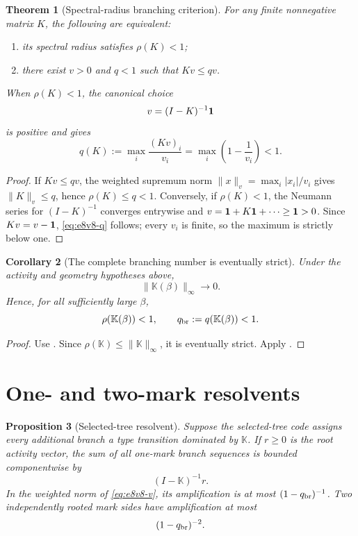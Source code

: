 \documentclass[11pt,oneside]{book}
\newtheorem{theorem}{Theorem}[chapter]
\newtheorem{proposition}[theorem]{Proposition}
\newtheorem{corollary}[theorem]{Corollary}
\theoremstyle{definition}
\theoremstyle{remark}
\begin{document}
\begin{theorem}[Spectral-radius branching criterion]
\label{thm:e8v8-spectral}
For any finite nonnegative matrix \(K\), the following are equivalent:
\begin{enumerate}[label=\textup{(\roman*)},leftmargin=3.5em]
\item its spectral radius satisfies \(\rho(K)<1\);
\item there exist \(v>0\) and \(q<1\) such that \(Kv\le qv\).
\end{enumerate}
When \(\rho(K)<1\), the canonical choice
\[
 v=(I-K)^{-1}{\bf1}                                 \label{eq:e8v8-v}
\]
is positive and gives
\[
 q(K):=\max_i\frac{(Kv)_i}{v_i}
 =\max_i\left(1-\frac1{v_i}\right)<1.               \label{eq:e8v8-q}
\]
\end{theorem}

\begin{proof}
If \(Kv\le qv\), the weighted supremum norm
\(\|x\|_v=\max_i|x_i|/v_i\) gives \(\|K\|_v\le q\), hence
\(\rho(K)\le q<1\).  Conversely, if \(\rho(K)<1\), the Neumann series
for \((I-K)^{-1}\) converges entrywise and
\(v={\bf1}+K{\bf1}+\cdots\ge{\bf1}>0\).
Since \(Kv=v-{\bf1}\), \eqref{eq:e8v8-q} follows; every \(v_i\) is
finite, so the maximum is strictly below one.
\end{proof}

\begin{corollary}[The complete branching number is eventually strict]
\label{cor:e8v8-eventual}
Under the activity and geometry hypotheses above,
\[
 \|{\mathbb K}(\beta)\|_\infty\longrightarrow0.
                                                        \label{eq:e8v8-K-zero}
\]
Hence, for all sufficiently large \(\beta\),
\[
 \rho({\mathbb K}(\beta))<1,\qquad
 q_{\rm br}:=q({\mathbb K}(\beta))<1.                \label{eq:e8v8-qbr}
\]
\end{corollary}

\begin{proof}
Use
.  Since
\(\rho({\mathbb K})\le\|{\mathbb K}\|_\infty\), it is eventually
strict.  Apply .
\end{proof}

\section{One- and two-mark resolvents}
\label{sec:e8v8-marks}

\begin{proposition}[Selected-tree resolvent]
\label{prop:e8v8-resolvent}
Suppose the selected-tree code assigns every additional branch a
type transition dominated by \({\mathbb K}\).  If \(r\ge0\) is the
root activity vector, the sum of all one-mark branch sequences is
bounded componentwise by
\[
 (I-{\mathbb K})^{-1}r.                             \label{eq:e8v8-one-mark}
\]
In the weighted norm of \eqref{eq:e8v8-v}, its amplification is at
most \((1-q_{\rm br})^{-1}\).  Two independently rooted mark sides
have amplification at most
\[
 (1-q_{\rm br})^{-2}.                               \label{eq:e8v8-two-mark}
\]
\end{proposition}
\end{document}
